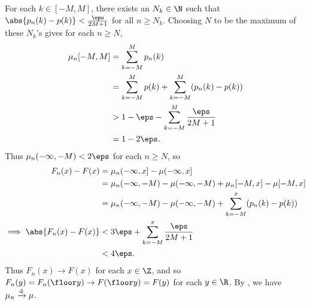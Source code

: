 \documentclass[12pt]{article}
\begin{document}
\begin{solution}
    For each $k \in [-M, M]$, there exists an $N_k \in \N$ such that
    $\abs{p_n(k) - p(k)} < \frac{\eps}{2M+1}$ for all $n \ge N_k$.
    Choosing $N$ to be the maximum of these $N_k$'s
    gives for each $n \ge N$,
    \begin{align*}
        \mu_n[-M, M] &= \sum_{k=-M}^M p_n(k) \\
            &= \sum_{k=-M}^M p(k) + \sum_{k=-M}^M (p_n(k) - p(k)) \\
            &> 1 - \eps - \sum_{k=-M}^M \frac{\eps}{2M+1} \\
            &= 1 - 2\eps.
    \end{align*}
    Thus $\mu_n(-\infty, -M) < 2\eps$ for each $n \ge N$, so \begin{align*}
        F_n(x) - F(x) &= \mu_n(-\infty, x] - \mu(-\infty, x] \\
            &= \mu_n(-\infty, -M) - \mu(-\infty, -M)
                + \mu_n[-M, x] - \mu[-M, x] \\
            &= \mu_n(-\infty, -M) - \mu(-\infty, -M)
                + \sum_{k=-M}^x (p_n(k) - p(k)) \\
        \implies \abs{F_n(x) - F(x)} &< 3\eps
                + \sum_{k=-M}^x \frac{\eps}{2M+1} \\
            &< 4\eps.
    \end{align*}
    Thus $F_n(x) \to F(x)$ for each $x \in \Z$,
    and so $F_n(y) = F_n(\floor y) \to F(\floor y) = F(y)$ for each
    $y \in \R$.
    By ,
    we have $\mu_n \xrightarrow{\text{d}} \mu$.
\end{solution}
\end{document}
